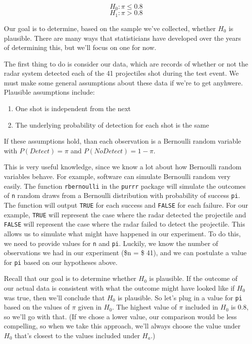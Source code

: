 \documentclass[
]{book}
\providecommand{\tightlist}{%
  \setlength{\itemsep}{0pt}\setlength{\parskip}{0pt}}
\theoremstyle{definition}
\theoremstyle{definition}
\theoremstyle{definition}
\theoremstyle{remark}
\begin{document}
\[H_0: \pi \le 0.8\]
\[H_1: \pi > 0.8\]

Our goal is to determine, based on the sample we've collected, whether \(H_0\) is plausible. There are many ways that statisticians have developed over the years of determining this, but we'll focus on one for now.

The first thing to do is consider our data, which are records of whether or not the radar system detected each of the 41 projectiles shot during the test event. We must make some general assumptions about these data if we're to get anyhwere. Plausible assumptions include:

\begin{enumerate}
\def\labelenumi{\arabic{enumi}.}
\tightlist
\item
  One shot is independent from the next
\item
  The underlying probability of detection for each shot is the same
\end{enumerate}

If these assumptions hold, than each observation is a Bernoulli random variable with \(P(Detect) = \pi\) and \(P(NoDetect) = 1 - \pi\).

This is very useful knowledge, since we know a lot about how Bernoulli random variables behave. For example, software can simulate Bernoulli random very easily. The function \texttt{rbernoulli} in the \texttt{purrr} package will simulate the outcomes of \texttt{n} random draws from a Bernoulli distribution with probability of success \texttt{pi}. The function will output \texttt{TRUE} for each success and \texttt{FALSE} for each failure. For our example, \texttt{TRUE} will represent the case where the radar detected the projectile and \texttt{FALSE} will represent the case where the radar failed to detect the projectile. This allows us to simulate what might have happened in our experiment. To do this, we need to provide values for \texttt{n} and \texttt{pi}. Luckily, we know the number of observations we had in our experiment (\$n = \$ 41), and we can postulate a value for \texttt{pi} based on our hypotheses above.

Recall that our goal is to determine whether \(H_0\) is plausible. If the outcome of our actual data is consistent with what the outcome might have looked like if \(H_0\) was true, then we'll conclude that \(H_0\) is plausible. So let's plug in a value for \texttt{pi} based on the values of \(\pi\) given in \(H_0\). The highest value of \(\pi\) included in \(H_0\) is \(0.8\), so we'll go with that. (If we chose a lower value, our comparison would be less compelling, so when we take this approach, we'll always choose the value under \(H_0\) that's closest to the values included under \(H_a\).)
\end{document}
